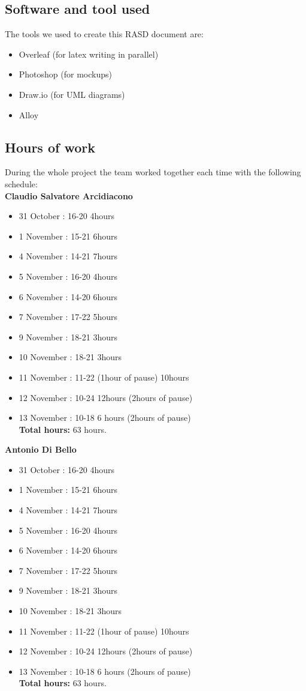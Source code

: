 \subsection{Software and tool used}
The tools we used to create this RASD document are:
\begin{itemize}
\item Overleaf (for latex writing in parallel)
\item Photoshop (for mockups)
\item Draw.io (for UML diagrams)
\item Alloy
\end{itemize}

\subsection{Hours of work}
During the whole  project the team worked together each time with the following schedule:\\
\textbf{Claudio Salvatore Arcidiacono}
\begin{itemize}
\item 31 October : 16-20  4hours
\item 1 November : 15-21  6hours
\item 4 November : 14-21  7hours
\item 5 November : 16-20  4hours
\item 6 November : 14-20  6hours
\item 7 November : 17-22  5hours
\item 9 November : 18-21  3hours
\item 10 November : 18-21  3hours
\item 11 November : 11-22 (1hour of pause) 10hours
\item 12 November : 10-24  12hours (2hours of pause)
\item 13 November : 10-18 6 hours (2hours of pause) \\

\textbf{Total hours:} 63 hours.
\end{itemize}


\textbf{Antonio Di Bello}
\begin{itemize}
\item 31 October : 16-20  4hours
\item 1 November : 15-21  6hours
\item 4 November : 14-21  7hours
\item 5 November : 16-20  4hours
\item 6 November : 14-20  6hours
\item 7 November : 17-22  5hours
\item 9 November : 18-21  3hours
\item 10 November : 18-21  3hours
\item 11 November : 11-22 (1hour of pause) 10hours
\item 12 November : 10-24  12hours (2hours of pause)
\item 13 November : 10-18 6 hours (2hours of pause) \\

\textbf{Total hours:} 63 hours.
\end{itemize}


